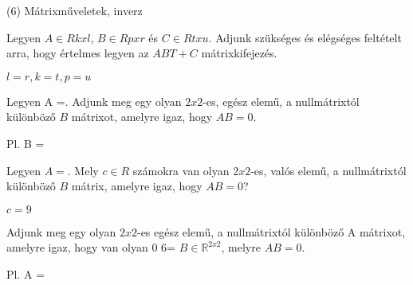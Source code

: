 \begin{frame}[plain]
\begin{tcolorbox}[center, colback={myyellow}, coltext={black}, colframe={myyellow}]
    {\RHuge  (6) Mátrixműveletek, inverz }
    \mmedskip
\end{tcolorbox}
\end{frame}

\begin{frame}
  \begin{tcolorbox}[title={6/1. -N-}]
    Legyen $A \in Rkxl$, $B \in Rpxr$ és $C \in Rtxu$. Adjunk szükséges és elégséges feltételt arra, hogy értelmes legyen az $ABT + C$ mátrixkifejezés.
  \tcblower

    \mmedskip 
    
    $l = r, k = t, p = u$
  \end{tcolorbox}
\end{frame}


\begin{frame}
  \begin{tcolorbox}[title={6/2. -N-}]
    Legyen A =. Adjunk meg egy olyan $2x2$-es, egész elemű, a nullmátrixtól különböző $B$ mátrixot, amelyre igaz, hogy $AB = 0$.

  \tcblower

    \mmedskip 
    
    Pl. B =
  \end{tcolorbox}
\end{frame}


\begin{frame}
  \begin{tcolorbox}[title={6/3. -N-}]
     Legyen $A = .$ Mely $c \in R$ számokra van olyan $2x2$-es, valós elemű, a nullmátrixtól különböző $B$ mátrix, amelyre igaz, hogy $AB = 0$?
  \tcblower

    \mmedskip 
    
    $c = 9$
  \end{tcolorbox}
\end{frame}


\begin{frame}
  \begin{tcolorbox}[title={6/4. -N-}]
     Adjunk meg egy olyan $2x2$-es egész elemű, a nullmátrixtól különböző A mátrixot, amelyre igaz, hogy van olyan 0 6= $B \in \mathbb{R}^{2 x 2}$, melyre $AB = 0$.
  \tcblower

    \mmedskip 
    
    Pl. A =
  \end{tcolorbox}
\end{frame}


